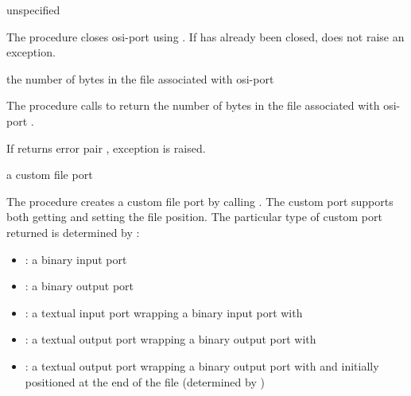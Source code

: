 \begin{procedure}
\end{procedure}
\returns{} unspecified

The  procedure closes osi-port  using
. If  has already been closed,
 does not raise an exception.

\begin{procedure}
\end{procedure}
\returns{} the number of bytes in the file associated with osi-port 

The  procedure calls 
to return the number of bytes in the file associated with osi-port
.

If  returns error pair , exception  is raised.

\begin{procedure}
\end{procedure}
\returns{} a custom file port

The  procedure creates a custom file port by
calling . The custom port
supports both getting and setting the file position. The particular
type of custom port returned is determined by :
\begin{itemize}
  \item {}: a binary input port
  \item {}: a binary output port
  \item {}: a textual input port wrapping a binary input
    port with 
  \item {}: a textual output port wrapping a binary
    output port with 
  \item {}: a textual output port wrapping a binary
    output port with  and initially positioned at
    the end of the file (determined by )
\end{itemize}


